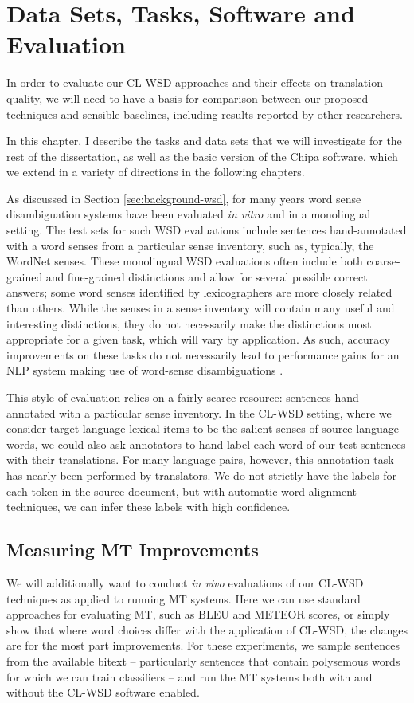 \chapter{Data Sets, Tasks, Software and Evaluation}
\label{chap:evaluation}
In order to evaluate our CL-WSD approaches and their effects on translation
quality, we will need to have a basis for comparison between our proposed
techniques and sensible baselines, including results reported by other
researchers.

In this chapter, I describe the tasks and data sets that we will investigate
for the rest of the dissertation, as well as the basic version of the Chipa
software, which we extend in a variety of directions in the following chapters.

As discussed in Section \ref{sec:background-wsd}, for many years word sense
disambiguation systems have been evaluated \emph{in vitro} and in a monolingual
setting. The test sets for such WSD evaluations include sentences
hand-annotated with a word senses from a particular sense inventory, such as,
typically, the WordNet senses. These monolingual WSD evaluations often include
both coarse-grained and fine-grained distinctions and allow for several
possible correct answers; some word senses identified by lexicographers are
more closely related than others.  While the senses in a sense inventory will
contain many useful and interesting distinctions, they do not necessarily make
the distinctions most appropriate for a given task, which will vary by
application. As such, accuracy improvements on these tasks do not necessarily
lead to performance gains for an NLP system making use of word-sense
disambiguations \cite{resnikwsdapplications}.

This style of evaluation relies on a fairly scarce resource: sentences
hand-annotated with a particular sense inventory.
In the CL-WSD setting, where we consider target-language lexical items to be
the salient senses of source-language words, we could also ask annotators to
hand-label each word of our test sentences with their translations.
For many language pairs, however, this annotation task has nearly been
performed by translators. We do not strictly have the labels for each token in
the source document, but with automatic word alignment techniques, we can infer
these labels with high confidence.

\section{Measuring MT Improvements}
We will additionally want to conduct \emph{in vivo} evaluations of our CL-WSD
techniques as applied to running MT systems. Here we can use standard
approaches for evaluating MT, such as BLEU and METEOR scores, or simply show
that where word choices differ with the application of CL-WSD, the changes are
for the most part improvements. For these experiments, we sample sentences
from the available bitext -- particularly sentences that contain polysemous
words for which we can train classifiers -- and run the MT systems both with
and without the CL-WSD software enabled.

